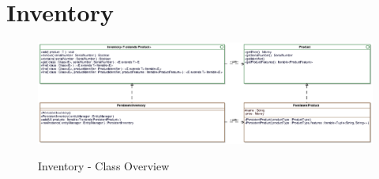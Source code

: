 \section{Inventory}

\begin{figure}[ht]
	\centering
  \includegraphics[width=1.0\textwidth]{images/Inventory_Overview.eps}
	\label{inventory_overview}
	\caption{Inventory - Class Overview}
\end{figure}
